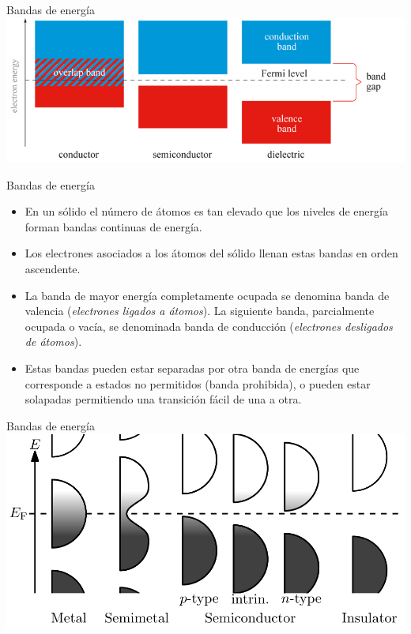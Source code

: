 \documentclass[xcolor={usenames,svgnames,dvipsnames}]{beamer}
\begin{document}
\begin{frame}[label=sec-1-1-3]{Bandas de energía}
\includegraphics[width=.9\linewidth]{../figs/simplified_band_diagram.jpg}
\end{frame}

\begin{frame}[label=sec-1-1-4]{Bandas de energía}
\begin{itemize}
\item En un \alert{sólido} el número de átomos es tan elevado que los niveles de energía forman \alert{bandas continuas de energía}.

\item Los \alert{electrones} asociados a los átomos del sólido \alert{llenan estas bandas en orden ascendente}.

\item La banda de mayor energía completamente ocupada se denomina \alert{banda de valencia} (\emph{electrones ligados a átomos}). La siguiente banda, parcialmente ocupada o vacía, se denominada \alert{banda de conducción} (\emph{electrones desligados de átomos}).

\item Estas bandas pueden estar separadas por otra banda de energías que corresponde a \alert{estados no permitidos} (\alert{banda prohibida}), o \alert{pueden estar solapadas} permitiendo una transición fácil de una a otra.
\end{itemize}
\end{frame}

\begin{frame}[label=sec-1-1-5]{Bandas de energía}
\includegraphics[width=.9\linewidth]{../figs/Band_filling_diagram.png}
\end{frame}
\end{document}
